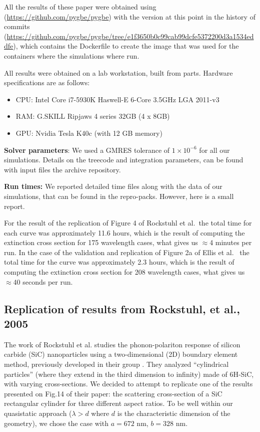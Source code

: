 All the results of these paper were obtained using \pygbe (\url{https://github.com/pygbe/pygbe})
with the version at this point in the history of commits (\url{https://github.com/pygbe/pygbe/tree/e1f3650b0c99cab99dcfe5372200d3a1534eddfe}), which contains 
the Dockerfile to create the image that was used for the containers where the simulations where run. 

All results were obtained on a lab workstation, built from parts.
Hardware specifications are as follows: 
\begin{itemize}
  \item CPU: Intel Core i7-5930K Haswell-E 6-Core 3.5GHz LGA 2011-v3
  \item RAM: G.SKILL Ripjaws 4 series 32GB (4 x 8GB)
  \item GPU: Nvidia Tesla K40c (with 12 GB memory)
\end{itemize}

\textbf{Solver parameters}: We used a GMRES tolerance of $1\times10^{-6}$ for all our simulations. Details on the treecode and integration parameters, 
can be found with input files the archive repository.

\textbf{Run times:} We reported detailed time files along with the data of our simulations, that can be found in the repro-packs. However, 
here is a small report.

For the result of the replication of Figure 4 of Rockstuhl et al.\ the total time for each curve was approximately 11.6 hours, which is the result of computing
the extinction cross section for 175 wavelength cases, what gives us $\approx$4 minutes per run. In the case of the validation and replication of Figure 2a of Ellis et al. \  
the total time for the curve was approximately 2.3 hours, which is the result of computing
the extinction cross section for 208 wavelength cases, what gives us $\approx$40 seconds per run.


\subsection{Replication of results from Rockstuhl, et al., 2005}

The work of Rockstuhl et al.\cite{rockstuhl2005} studies the phonon-polariton response of silicon carbide (SiC)
nanoparticles using a two-dimensional (2D) boundary element method, 
previously developed in their group \cite{rockstuhl2003}. 
They analyzed ``cylindrical particles'' (where they extend in the third dimension to infinity) made of 6H-SiC, with varying cross-sections.
We decided to attempt to replicate one of the results presented on Fig.14 of their paper:
the scattering cross-section of a SiC rectangular cylinder for three different aspect ratios. 
To be well within our quasistatic approach ($\lambda > d$ where $d$ is the characteristic
dimension of the geometry), we chose the case with $a=672$ nm, $b=328$ nm.

